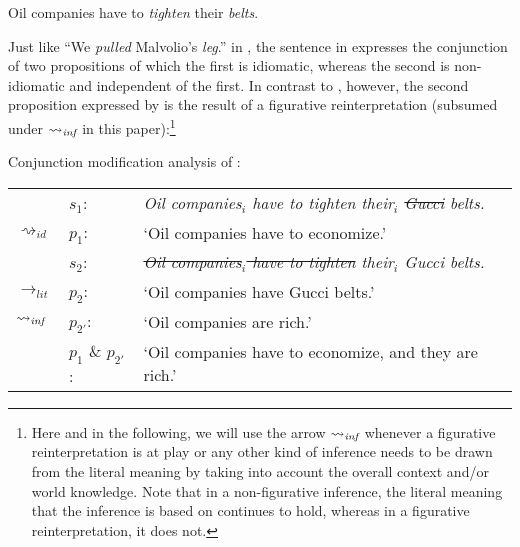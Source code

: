 \documentclass[output=paper]{langsci/langscibook}
\begin{document}
\ea \label{Gucci belts -- simple}
Oil companies have to \textit{tighten} their \underline{} \textit{belts}.
\z

\noindent Just like ``We \textit{pulled} Malvolio's \underline{} \textit{leg}.'' in , the sentence in  expresses the conjunction of two propositions of which the first is idiomatic, whereas the second is non-idiomatic and independent of the first. In contrast to , however, the second proposition expressed by  is the result of a figurative reinterpretation (subsumed under $\rightsquigarrow_{\text{\itshape inf}}$ in this paper):\footnote{Here and in the following, we will use the arrow $\rightsquigarrow_{\text{\itshape inf}}$ whenever a figurative reinterpretation is at play or any other kind of inference needs to be drawn from the literal meaning by taking into account the overall context and/or world knowledge. Note that in a non-figurative inference, the literal meaning that the inference is based on continues to hold, whereas in a figurative reinterpretation, it does not.}

\ea \label{analysis Gucci belts -- simple} 
Conjunction modification analysis of :\smallskip\\
\begin{tabularx}{\linewidth}[t]{@{}llQ@{}}
						 & $s_{1}$: & \textit{Oil companies$_{i}$ have to tighten their$_{i}$ \sout{Gucci} belts.} \\
$\rightsquigarrow_{id}$	 & $p_{1}$: & `Oil companies have to economize.' \medskip\\
                         & $s_{2}$: & \textit{\sout{Oil companies$_{i}$ have to tighten} their$_{i}$ Gucci belts.} \\
$\rightarrow_{lit}$      & $p_{2}$: & `Oil companies have Gucci belts.' \\
$\rightsquigarrow_{\text{\itshape inf}}$ &	$p_{2'}$: &  `Oil companies are rich.' \medskip\\
                        &	$p_{1}$ \& $p_{2'}$: & `Oil companies have to economize, and they are rich.'
\end{tabularx}
\z
\end{document}
